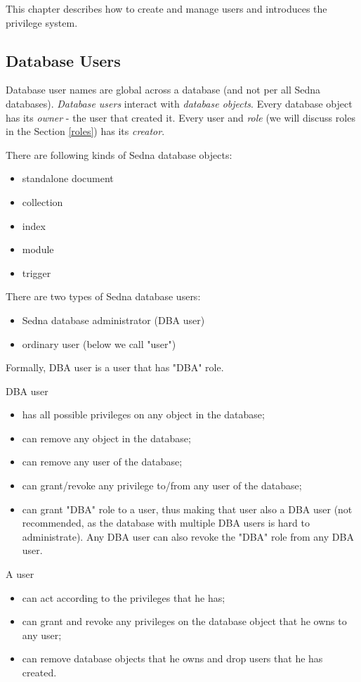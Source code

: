 \documentclass[a4paper,12pt]{article}
\begin{document}
This chapter describes how to create and manage users and introduces the privilege system.

\subsection{Database Users}

Database user names are global across a database (and not per all Sedna databases). \emph{Database users} interact with \emph{database objects}. Every database object has its \emph{owner} - the user that created it. Every user and \emph{role} (we will discuss roles in the Section \ref{roles}) has its \emph{creator}.

There are following kinds of Sedna database objects:
\begin{itemize}
\item standalone document
\item collection
\item index
\item module
\item trigger
\end{itemize}

There are two types of Sedna database users:

\begin{itemize}
\item Sedna database administrator (DBA user)
\item ordinary user (below we call "user")
\end{itemize}

Formally, DBA user is a user that has "DBA" role.

DBA user
\begin{itemize}
\item has all possible privileges on any object in the database;
\item can remove any object in the database;
\item can remove any user of the database;
\item can grant/revoke any privilege to/from any user of the database;
\item can grant "DBA" role to a user, thus making that user also a DBA user (not recommended, as the database with multiple DBA users is hard to administrate). Any DBA user can also revoke the "DBA" role from any DBA user.
\end{itemize}

A user
\begin{itemize}
\item can act according to the privileges that he has;
\item can grant and revoke any privileges on the database object that he owns to any user;
\item can remove database objects that he owns and drop users that he has created.
\end{itemize}
\end{document}
